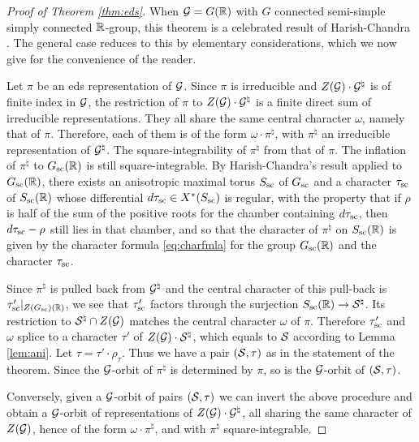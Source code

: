 \documentclass{article}
\theoremstyle{definition}
\numberwithin{equation}{section}
\renewcommand{\-}{\hyp{}}
\begin{document}
\begin{proof}[Proof of Theorem \ref{thm:eds}]
	When $\mathcal{G}=G(\mathbb{R})$ with $G$ connected semi-simple simply connected $\mathbb{R}$-group, this theorem is a celebrated result of Harish-Chandra \cite{HCDSI}. The general case reduces to this by elementary considerations, which we now give for the convenience of the reader.

	Let $\pi$ be an eds representation of $\mathcal{G}$. Since $\pi$ is irreducible and $Z(\mathcal{G})\cdot \mathcal{G}^\natural$ is of finite index in $\mathcal{G}$, the restriction of $\pi$ to $Z(\mathcal{G})\cdot \mathcal{G}^\natural$ is a finite direct sum of irreducible representations. They all share the same central character $\omega$, namely that of $\pi$. Therefore, each of them is of the form $\omega \cdot \pi^\natural$, with $\pi^\natural$ an irreducible representation of $\mathcal{G}^\natural$. The square-integrability of $\pi^\natural$ from that of $\pi$. The inflation of $\pi^\natural$ to $G_{\textrm{sc}}(\mathbb{R})$ is still square-integrable. By Harish-Chandra's result applied to $G_{\textrm{sc}}(\mathbb{R})$, there exists an anisotropic maximal torus $S_{\textrm{sc}}$ of $G_{\textrm{sc}}$ and a character $\tau_{\textrm{sc}}$ of $S_{\textrm{sc}}(\mathbb{R})$ whose differential $d\tau_{\textrm{sc}} \in X^*(S_{\textrm{sc}})$ is regular, with the property that if $\rho$ is half of the sum of the positive roots for the chamber containing $d\tau_{\textrm{sc}}$, then $d\tau_{\textrm{sc}}-\rho$ still lies in that chamber, and so that the character of $\pi^\natural$ on $S_{\textrm{sc}}(\mathbb{R})$ is given by the character formula \eqref{eq:charfmla} for the group $G_{\textrm{sc}}(\mathbb{R})$ and the character $\tau_{\textrm{sc}}$.
	
	Since $\pi^\natural$ is pulled back from $\mathcal{G}^\natural$ and the central character of this pull-back is $\tau'_{\textrm{sc}}|_{Z(G_{\textrm{sc}})(\mathbb{R})}$, we see that $\tau'_{\textrm{sc}}$ factors through the surjection $S_{\textrm{sc}}(\mathbb{R}) \to \mathcal{S}^\natural$. Its restriction to $\mathcal{S}^\natural \cap Z(\mathcal{G})$ matches the central character $\omega$ of $\pi$. Therefore $\tau'_{\textrm{sc}}$ and $\omega$ splice to a character $\tau'$ of $Z(\mathcal{G}) \cdot \mathcal{S}^\natural$, which equals to $\mathcal{S}$ according to Lemma \ref{lem:ani}. Let $\tau=\tau' \cdot \rho_\tau$. Thus we have a pair $(\mathcal{S},\tau)$ as in the statement of the theorem. Since the $\mathcal{G}$-orbit of $\pi^\natural$ is determined by $\pi$, so is the $\mathcal{G}$-orbit of $(\mathcal{S},\tau)$.

	Conversely, given a $\mathcal{G}$-orbit of pairs $(\mathcal{S},\tau)$ we can invert the above procedure and obtain a $\mathcal{G}$-orbit of representations of $Z(\mathcal{G}) \cdot \mathcal{G}^\natural$, all sharing the same character of $Z(\mathcal{G})$, hence of the form $\omega \cdot \pi^\natural$, and with $\pi^\natural$ square-integrable.


\end{proof}
\end{document}

